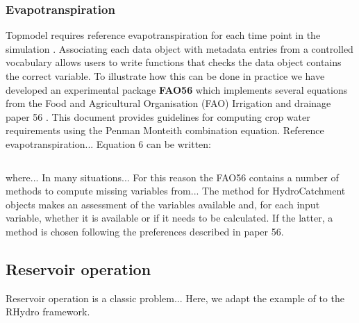 \documentclass{icldt}\usepackage[]{graphicx}\usepackage[]{color}
\begin{document}
\subsubsection{Evapotranspiration}
Topmodel requires reference evapotranspiration for each time point in the simulation \citep{}. Associating each data object with metadata entries from a controlled vocabulary allows users to write functions that checks the data object contains the correct variable. %
To illustrate how this can be done in practice we have developed an experimental package \textbf{FAO56} which implements several equations from the Food and Agricultural Organisation (FAO) Irrigation and drainage paper 56 \citep{allen1998}. This document provides guidelines for computing crop water requirements using the Penman Monteith combination equation. Reference evapotranspiration... Equation 6 can be written:

\begin{equation}
\end{equation}

\noindent where... In many situations... For this reason the FAO56 contains a number of methods to compute missing variables from... The method for HydroCatchment objects makes an assessment of the variables available and, for each input variable, whether it is available or if it needs to be calculated. If the latter, a method is chosen following the preferences described in paper 56. 



\subsection{Reservoir operation}
Reservoir operation is a classic problem... Here, we adapt the example of \citep{garcia2016} to the RHydro framework. \\
\end{document}
